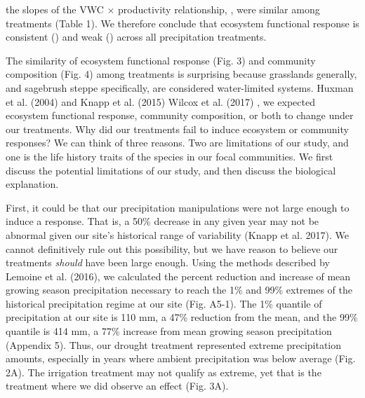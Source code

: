 \documentclass[fleqn,10pt,lineno]{wlpeerj} %
\begin{document}
 the slopes of the VWC
\(\times\) productivity relationship, , were
similar among treatments (Table 1). We therefore conclude that ecosystem
functional response is consistent () and weak
() across all precipitation
treatments.

The similarity of ecosystem functional response (Fig. 3) and community
composition (Fig. 4) among treatments is surprising because grasslands
generally, and sagebrush steppe specifically, are considered
water-limited systems.  Huxman et al. (2004) and Knapp
et al. (2015)
Wilcox et al. (2017)
, we expected ecosystem functional
response, community composition, or both to change under our treatments.
Why did our treatments fail to induce ecosystem or community responses?
We can think of three reasons. Two are limitations of our study, and one
is the life history traits of the species in our focal communities. We
first discuss the potential limitations of our study, and then discuss
the biological explanation.

First, it could be that our precipitation manipulations were not large
enough to induce a response. That is, a 50\% decrease in any given year
may not be abnormal given our site's historical range of variability
(Knapp et al. 2017). We cannot definitively rule out this possibility,
but we have reason to believe our treatments \emph{should} have been
large enough. Using the methods described by Lemoine et al. (2016), we
calculated the percent reduction and increase of mean growing season
precipitation necessary to reach the 1\% and 99\% extremes of the
historical precipitation regime at our site (Fig. A5-1). The 1\%
quantile of precipitation at our site is 110 mm, a 47\% reduction from
the mean, and the 99\% quantile is 414 mm, a 77\% increase from mean
growing season precipitation (Appendix 5). Thus, our drought treatment
represented extreme precipitation amounts, especially in years where
ambient precipitation was below average (Fig. 2A). The irrigation
treatment may not qualify as extreme, yet that is the treatment where we
did observe an effect (Fig. 3A).
\end{document}
